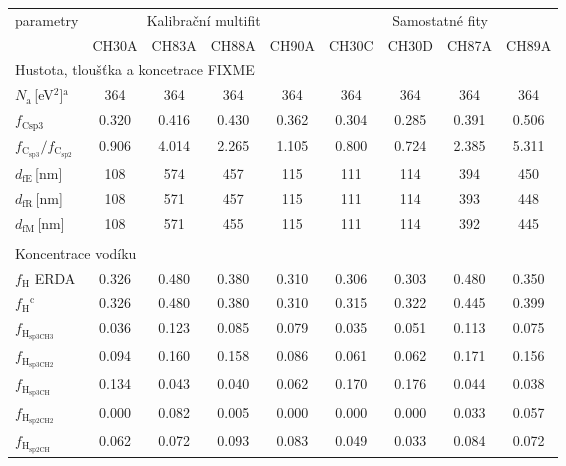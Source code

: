 \begin{tabular}{lcccccccc}
\hline
parametry & \multicolumn{4}{c}{Kalibrační multifit} & \multicolumn{4}{c}{Samostatné fity}\\
 & CH30A & CH83A & CH88A & CH90A & CH30C & CH30D & CH87A & CH89A\\
\hline
\multicolumn{9}{l}{Hustota, tloušťka a koncetrace FIXME}\\
\hline
$N_\mathrm{a}$\,[eV$^2$]$^\mathrm{a}$ & 364 & 364 & 364 & 364 & 364 & 364 & 364 & 364\\
$f_\mathrm{Csp3}$ & 0.320 & 0.416 & 0.430 & 0.362 & 0.304 & 0.285 & 0.391 & 0.506\\
$f_\mathrm{C_{sp3}}/f_\mathrm{C_{sp2}}$ & 0.906 & 4.014 & 2.265 & 1.105 & 0.800 & 0.724 & 2.385 & 5.311\\
$d_\mathrm{fE}$\,[nm] & 108 & 574 & 457 & 115 & 111 & 114 & 394 & 450\\
$d_\mathrm{fR}$\,[nm] & 108 & 571 & 457 & 115 & 111 & 114 & 393 & 448\\
$d_\mathrm{fM}$\,[nm] & 108 & 571 & 455 & 115 & 111 & 114 & 392 & 445\\

\multicolumn{9}{l}{}\\
\multicolumn{9}{l}{Koncentrace vodíku}\\
\hline
$f_\mathrm{H}$ ERDA & 0.326 & 0.480 & 0.380 & 0.310 & 0.306 & 0.303 & 0.480 & 0.350\\
$f_\mathrm{H}$$^\mathrm{c}$ & 0.326 & 0.480 & 0.380 & 0.310 & 0.315 & 0.322 & 0.445 & 0.399\\
$f_\mathrm{H_{sp3CH3}}$ & 0.036 & 0.123 & 0.085 & 0.079 & 0.035 & 0.051 & 0.113 & 0.075\\
$f_\mathrm{H_{sp3CH2}}$ & 0.094 & 0.160 & 0.158 & 0.086 & 0.061 & 0.062 & 0.171 & 0.156\\
$f_\mathrm{H_{sp3CH}}$ & 0.134 & 0.043 & 0.040 & 0.062 & 0.170 & 0.176 & 0.044 & 0.038\\
$f_\mathrm{H_{sp2CH2}}$ & 0.000 & 0.082 & 0.005 & 0.000 & 0.000 & 0.000 & 0.033 & 0.057\\
$f_\mathrm{H_{sp2CH}}$ & 0.062 & 0.072 & 0.093 & 0.083 & 0.049 & 0.033 & 0.084 & 0.072\\


\end{tabular}
